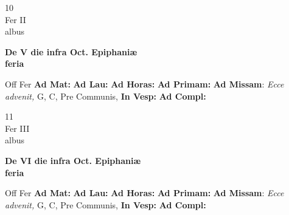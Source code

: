 \documentclass[10pt, openany]{book}
\begin{document}
        \begin{center}
            \begin{minipage}{3.5in}
                \vspace{2em}
                \begin{minipage}{0.5in}
                    {\Huge 10} \\
                    {\normalsize Fer II} \\
                    {\normalsize albus}
                \end{minipage}
                \begin{minipage}{3.0in}
                    \textbf{ \large De V die infra Oct. Epiphaniæ \\
                    \textnormal{\normalsize feria}} \\ 
                \end{minipage}
                \begin{justify}Off Fer
                    \textbf{Ad Mat: }
                    \textbf{Ad Lau: }
                    \textbf{Ad Horas: }
                    \textbf{Ad Primam: }\textbf{Ad Missam}: \textit{Ecce advenit,} G, C, Pre Communis,  
                    \textbf{In Vesp: }
                    \textbf{Ad Compl: }
                \end{justify}
            \end{minipage}
        \end{center}
    
        \begin{center}
            \begin{minipage}{3.5in}
                \vspace{2em}
                \begin{minipage}{0.5in}
                    {\Huge 11} \\
                    {\normalsize Fer III} \\
                    {\normalsize albus}
                \end{minipage}
                \begin{minipage}{3.0in}
                    \textbf{ \large De VI die infra Oct. Epiphaniæ \\
                    \textnormal{\normalsize feria}} \\ 
                \end{minipage}
                \begin{justify}Off Fer
                    \textbf{Ad Mat: }
                    \textbf{Ad Lau: }
                    \textbf{Ad Horas: }
                    \textbf{Ad Primam: }\textbf{Ad Missam}: \textit{Ecce advenit,} G, C, Pre Communis,  
                    \textbf{In Vesp: }
                    \textbf{Ad Compl: }
                \end{justify}
            \end{minipage}
        \end{center}
    
\end{document}
